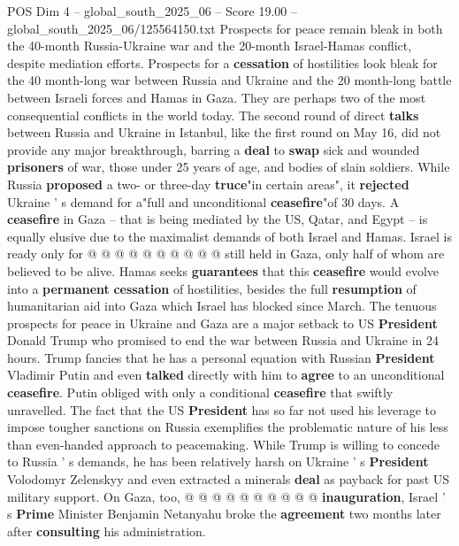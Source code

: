 \begin{textsample}{POS Dim 4 – global\_south\_2025\_06 – Score 19.00 – global\_south\_2025\_06/125564150.txt}  \label{ex:f4_pos_354}
Prospects for peace remain bleak in both the 40-month Russia-Ukraine war and the 20-month Israel-Hamas conflict, despite mediation efforts.
Prospects for a \textbf{cessation} of hostilities look bleak for the 40 month-long war between Russia and Ukraine and the 20 month-long battle between Israeli forces and Hamas in Gaza.
They are perhaps two of the most consequential conflicts in the world today.
The second round of direct \textbf{talks} between Russia and Ukraine in Istanbul, like the first round on May 16, did not provide any major breakthrough, barring a \textbf{deal} to \textbf{swap} sick and wounded \textbf{prisoners} of war, those under 25 years of age, and bodies of slain soldiers.
While Russia \textbf{proposed} a two- or three-day \textbf{truce}"in certain areas", it \textbf{rejected} Ukraine ' s demand for a"full and unconditional \textbf{ceasefire}"of 30 days.
A \textbf{ceasefire} in Gaza -- that is being mediated by the US, Qatar, and Egypt -- is equally elusive due to the maximalist demands of both Israel and Hamas.
Israel is ready only for @ @ @ @ @ @ @ @ @ @ still held in Gaza, only half of whom are believed to be alive.
Hamas seeks \textbf{guarantees} that this \textbf{ceasefire} would evolve into a \textbf{permanent} \textbf{cessation} of hostilities, besides the full \textbf{resumption} of humanitarian aid into Gaza which Israel has blocked since March.
The tenuous prospects for peace in Ukraine and Gaza are a major setback to US \textbf{President} Donald Trump who promised to end the war between Russia and Ukraine in 24 hours.
Trump fancies that he has a personal equation with Russian \textbf{President} Vladimir Putin and even \textbf{talked} directly with him to \textbf{agree} to an unconditional \textbf{ceasefire}.
Putin obliged with only a conditional \textbf{ceasefire} that swiftly unravelled.
The fact that the US \textbf{President} has so far not used his leverage to impose tougher sanctions on Russia exemplifies the problematic nature of his less than even-handed approach to peacemaking.
While Trump is willing to concede to Russia ' s demands, he has been relatively harsh on Ukraine ' s \textbf{President} Volodomyr Zelenskyy and even extracted a minerals \textbf{deal} as payback for past US military support.
On Gaza, too, @ @ @ @ @ @ @ @ @ @ \textbf{inauguration}, Israel ' s \textbf{Prime} Minister Benjamin Netanyahu broke the \textbf{agreement} two months later after \textbf{consulting} his administration.

\end{textsample}
